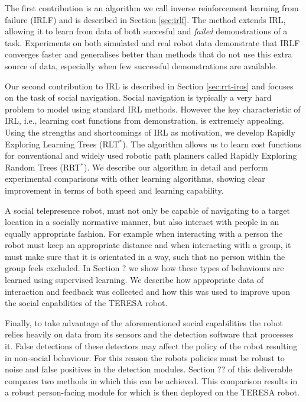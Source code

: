 \documentclass[a4paper,11pt]{report}
\begin{document}
The first contribution is an algorithm we call inverse reinforcement learning from failure (IRLF) and is described in Section \ref{sec:irlf}. The method extends IRL, allowing it to learn from data of both succesful and \emph{failed} demonstrations of a task. Experiments on both simulated and real robot data demonstrate that IRLF converges faster and generalises better than methods that do not use this extra source of data, especially when few successful demonstrations are available. 

Our second contribution to IRL is described in Section \ref{sec:rrt-iros} and focuses on the task of social navigation. Social navigation is typically a very hard problem to model using standard IRL methods. However the key characteristic of IRL, i.e., learning cost functions from demonstration, is extremely appealing. Using the strengths and shortcomings of IRL as motivation, we develop Rapidly Exploring Learning Trees (RLT$^*$). The algorithm allows us to learn cost functions for conventional and widely used robotic path planners called Rapidly Exploring Random Trees (RRT$^*$). We describe our algorithm in detail and perform experimental comparisons with other learning algorithms, showing clear improvement in terms of both speed and learning capability.

A social telepresence robot, must not only be capable of navigating to a target location in a socially normative manner, but also interact with people in an equally appropriate fashion. For example when interacting with a person the robot must keep an appropriate distance and when interacting with a group, it must make sure that it is orientated in a way, such that no person within the group feels excluded. In Section ? we show how these types of behaviours are learned using supervised learning. We describe how appropriate data of interaction and feedback was collected and how this was used to improve upon the social capabilities of the TERESA robot.

Finally, to take advantage of the aforementioned social capabilities the robot relies heavily on data from its sensors and the detection software that processes it. False detections of these detectors may affect the policy of the robot resulting in non-social behaviour. For this reason the robots policies must be robust to noise and false positives in the detection modules. Section ?? of this deliverable compares two methods in which this can be achieved. This comparison results in a robust person-facing module for which is then deployed on the TERESA robot.
\end{document}
